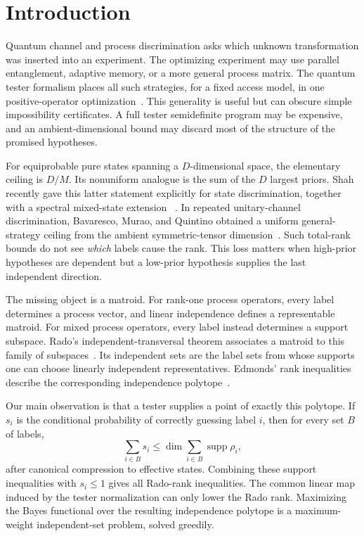 \documentclass[11pt]{article}
\theoremstyle{definition}
\theoremstyle{remark}
\newcommand{\supp}{\operatorname{supp}}
\begin{document}
\section{Introduction}

Quantum channel and process discrimination asks which unknown transformation
was inserted into an experiment.  The optimizing experiment may use parallel
entanglement, adaptive memory, or a more general process matrix.  The quantum
tester formalism places all such strategies, for a fixed access model, in one
positive-operator optimization~\cite{chiribella2009,sedlak2016}.  This
generality is useful but can obscure simple impossibility certificates.  A
full tester semidefinite program may be expensive, and an ambient-dimensional
bound may discard most of the structure of the promised hypotheses.

For equiprobable pure states spanning a $D$-dimensional space, the elementary
ceiling is $D/M$.  Its nonuniform analogue is the sum of the $D$ largest
priors.  Shah recently gave this latter statement explicitly for state
discrimination, together with a spectral mixed-state extension
~\cite{shah2025}.  In repeated unitary-channel discrimination, Bavaresco,
Murao, and Quintino obtained a uniform general-strategy ceiling from the
ambient symmetric-tensor dimension~\cite{bavaresco2022}.  Such total-rank
bounds do not see \emph{which} labels cause the rank.  This loss matters when
high-prior hypotheses are dependent but a low-prior hypothesis supplies the
last independent direction.

The missing object is a matroid.  For rank-one process operators, every label
determines a process vector, and linear independence defines a representable
matroid.  For mixed process operators, every label instead determines a
support subspace.  Rado's independent-transversal theorem associates a
matroid to this family of subspaces~\cite{rado1942}.  Its independent sets are
the label sets from whose supports one can choose linearly independent
representatives.  Edmonds' rank inequalities describe the corresponding
independence polytope~\cite{edmonds1970}.

Our main observation is that a tester supplies a point of exactly this
polytope.  If $s_i$ is the conditional probability of correctly guessing
label $i$, then for every set $B$ of labels,
\[
  \sum_{i\in B}s_i
  \leq \dim\sum_{i\in B}\supp\rho_i,
\]
after canonical compression to effective states.  Combining these support
inequalities with $s_i\leq1$ gives all Rado-rank inequalities.  The common
linear map induced by the tester normalization can only lower the Rado rank.
Maximizing the Bayes functional over the resulting independence polytope is a
maximum-weight independent-set problem, solved greedily.
\end{document}
